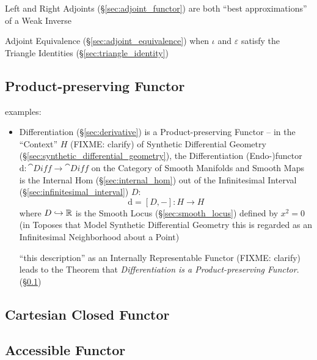 Left and Right Adjoints (\S\ref{sec:adjoint_functor}) are both ``best
approximations'' of a Weak Inverse

Adjoint Equivalence (\S\ref{sec:adjoint_equivalence}) when $\iota$ and
$\varepsilon$ satisfy the Triangle Identities
(\S\ref{sec:triangle_identity})



\subsection{Product-preserving Functor}
\label{sec:product_preserving_functor}

examples:
\begin{itemize}
\item Differentiation (\S\ref{sec:derivative}) is a Product-preserving Functor
  -- in the ``Context'' $H$ (FIXME: clarify) of Synthetic Differential Geometry
  (\S\ref{sec:synthetic_differential_geometry}), the Differentiation
  (Endo-)functor $\mathrm{d} : \cat{Diff} \rightarrow \cat{Diff}$ on the
  Category of Smooth Manifolds and Smooth Maps is the Internal Hom
  (\S\ref{sec:internal_hom}) out of the Infinitesimal Interval
  (\S\ref{sec:infinitesimal_interval}) $D$:
  \[
    \mathrm{d} = [D,-] : H \rightarrow H
  \]
  where $D \hookrightarrow \mathbb{R}$ is the Smooth Locus
  (\S\ref{sec:smooth_locus}) defined by $x^2 = 0$ (in Toposes that Model
  Synthetic Differential Geometry this is regarded as an Infinitesimal
  Neighborhood about a Point)

  ``this description'' as an Internally Representable Functor (FIXME: clarify)
  leads to the Theorem that \emph{Differentiation is a Product-preserving
    Functor}. (\S\ref{sec:product_preserving_functor})
\end{itemize}


\subsection{Cartesian Closed Functor}
\label{sec:cartesian_closed_functor}

\subsection{Accessible Functor}\label{sec:accessible_functor}

